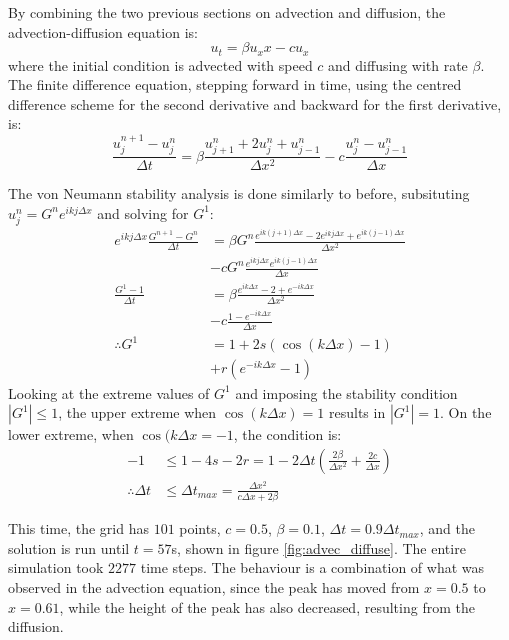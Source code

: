 \documentclass[twocolumn]{article}
\begin{document}
By combining the two previous sections on advection and diffusion, the
advection-diffusion equation is:
\begin{equation}
u_t = \beta u_xx - c u_x
\end{equation}
where the initial condition is advected with speed $c$ and diffusing
with rate $\beta$. The finite difference equation, stepping forward in
time, using the centred difference scheme for the second derivative
and backward for the first derivative, is:
\begin{equation}
\frac{u_j^{n+1} - u_j^n}{\Delta t} = \beta \frac{u_{j+1}^n + 2 u_j^n
	+ u_{j-1}^n}{\Delta x^2} - c \frac{u_j^n - u_{j-1}^n}{\Delta x}
\end{equation}

The von Neumann stability analysis is done similarly to before,
subsituting $u_j^n = G^n e^{i k j \Delta x}$ and solving for $G^1$:
\begin{equation}
\begin{aligned}
e^{i k j \Delta x} \frac{G^{n+1} - G^n}{\Delta t} &=
\beta G^n \frac{e^{i k (j + 1) \Delta x} - 2 e^{i k j \Delta x}
	+ e^{i k (j - 1) \Delta x}}{\Delta x^2} \\
&- c G^n \frac{e^{i k j \Delta x}
	e^{i k (j - 1) \Delta x}}{\Delta x} \\
\frac{G^1 - 1}{\Delta t} &= \beta \frac{e^{i k \Delta x} - 2 +
	e^{- i k \Delta x}}{\Delta x^2} \\
&- c \frac{1 - e^{- i k \Delta
		x}}{\Delta x} \\
\therefore G^1 &= 1 + 2 s \left( \cos(k \Delta x) - 1 \right) \\
&+ r \left(e^{-i k \Delta x} - 1 \right)
\end{aligned}
\end{equation}
Looking at the extreme values of $G^1$ and imposing the stability
condition $|G^1| \leq 1$, the upper extreme when $\cos(k \Delta x) =
1$ results in $|G^1| = 1$. On the lower extreme, when $\cos(k \Delta x
= -1$, the condition is:
\begin{equation}
\begin{aligned}
-1 &\leq 1 - 4s - 2r =1 - 2 \Delta t \left( \frac{2 \beta}{\Delta
	x^2} + \frac{2 c}{\Delta x} \right) \\
\therefore \Delta t &\leq \Delta t_{max} = \frac{\Delta x^2}{c
	\Delta x + 2 \beta}
\end{aligned}
\end{equation}

This time, the grid has $101$ points, $c = 0.5$, $\beta = 0.1$,
$\Delta t = 0.9 \Delta t_{max}$, and the solution is run until $t =
57$s, shown in figure \ref{fig:advec_diffuse}. The entire simulation
took $2277$ time steps. The behaviour is a combination of what was
observed in the advection equation, since the peak has moved from
$x=0.5$ to $x=0.61$, while the height of the peak has also decreased,
resulting from the diffusion.
\end{document}
